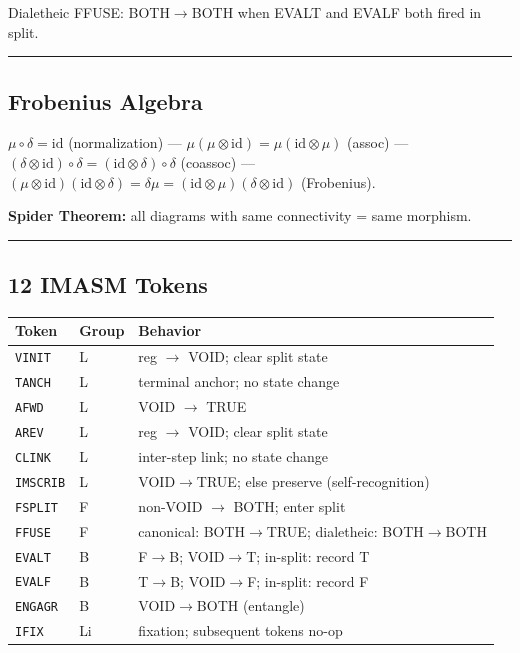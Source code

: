 \documentclass[12pt,a4paper]{article}
\begin{document}
Dialetheic FFUSE: BOTH\(\to\)BOTH when EVALT and EVALF both fired in
split.

\begin{center}\rule{0.5\linewidth}{0.5pt}\end{center}

\hypertarget{frobenius-algebra}{%
\subsection{Frobenius Algebra}\label{frobenius-algebra}}

\(\mu \circ \delta = \mathrm{id}\) (normalization) ---
\(\mu(\mu\otimes\mathrm{id}) = \mu(\mathrm{id}\otimes\mu)\) (assoc) ---
\((\delta\otimes\mathrm{id})\circ\delta = (\mathrm{id}\otimes\delta)\circ\delta\)
(coassoc) ---
\((\mu\otimes\mathrm{id})(\mathrm{id}\otimes\delta) = \delta\mu = (\mathrm{id}\otimes\mu)(\delta\otimes\mathrm{id})\)
(Frobenius).

\textbf{Spider Theorem:} all diagrams with same connectivity = same
morphism.

\begin{center}\rule{0.5\linewidth}{0.5pt}\end{center}

\hypertarget{imasm-tokens}{%
\subsection{12 IMASM Tokens}\label{imasm-tokens}}

\begin{longtable}[]{@{}lll@{}}
\toprule
Token & Group & Behavior\tabularnewline
\midrule
\endhead
\texttt{VINIT} & L & reg \(\to\) VOID; clear split state\tabularnewline
\texttt{TANCH} & L & terminal anchor; no state change\tabularnewline
\texttt{AFWD} & L & VOID \(\to\) TRUE\tabularnewline
\texttt{AREV} & L & reg \(\to\) VOID; clear split state\tabularnewline
\texttt{CLINK} & L & inter-step link; no state change\tabularnewline
\texttt{IMSCRIB} & L & VOID\(\to\)TRUE; else preserve
(self-recognition)\tabularnewline
\texttt{FSPLIT} & F & non-VOID \(\to\) BOTH; enter split\tabularnewline
\texttt{FFUSE} & F & canonical: BOTH\(\to\)TRUE; dialetheic:
BOTH\(\to\)BOTH\tabularnewline
\texttt{EVALT} & B & F\(\to\)B; VOID\(\to\)T; in-split: record
T\tabularnewline
\texttt{EVALF} & B & T\(\to\)B; VOID\(\to\)F; in-split: record
F\tabularnewline
\texttt{ENGAGR} & B & VOID\(\to\)BOTH (entangle)\tabularnewline
\texttt{IFIX} & Li & fixation; subsequent tokens no-op\tabularnewline
\bottomrule
\end{longtable}
\end{document}
